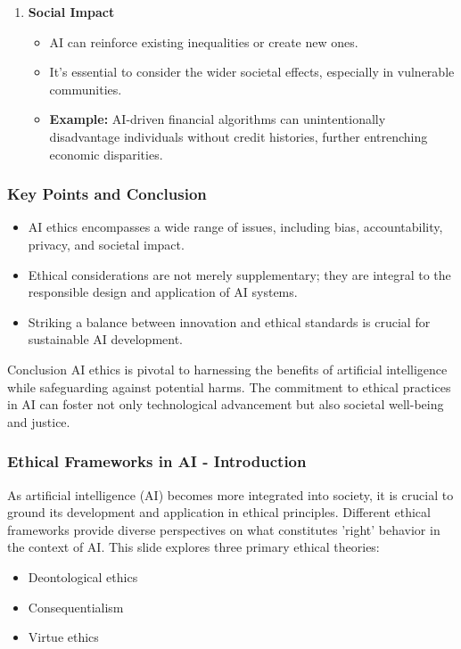 \documentclass[aspectratio=169]{beamer}
\begin{document}
\begin{frame}[fragile]
\begin{enumerate}
        \item \textbf{Social Impact}
            \begin{itemize}
                \item AI can reinforce existing inequalities or create new ones.
                \item It’s essential to consider the wider societal effects, especially in vulnerable communities.
                \item \textbf{Example:} AI-driven financial algorithms can unintentionally disadvantage individuals without credit histories, further entrenching economic disparities.
            \end{itemize}
    \end{enumerate}
\end{frame}

\begin{frame}[fragile]
    \frametitle{Key Points and Conclusion}
    \begin{itemize}
        \item AI ethics encompasses a wide range of issues, including bias, accountability, privacy, and societal impact.
        \item Ethical considerations are not merely supplementary; they are integral to the responsible design and application of AI systems.
        \item Striking a balance between innovation and ethical standards is crucial for sustainable AI development.
    \end{itemize}
    
    \begin{block}{Conclusion}
        AI ethics is pivotal to harnessing the benefits of artificial intelligence while safeguarding against potential harms. The commitment to ethical practices in AI can foster not only technological advancement but also societal well-being and justice.
    \end{block}
\end{frame}

\begin{frame}[fragile]
    \frametitle{Ethical Frameworks in AI - Introduction}
    As artificial intelligence (AI) becomes more integrated into society, it is crucial to ground its development and application in ethical principles. Different ethical frameworks provide diverse perspectives on what constitutes 'right' behavior in the context of AI. This slide explores three primary ethical theories:
    
    \begin{itemize}
        \item Deontological ethics
        \item Consequentialism
        \item Virtue ethics
    \end{itemize}
\end{frame}
\end{document}
